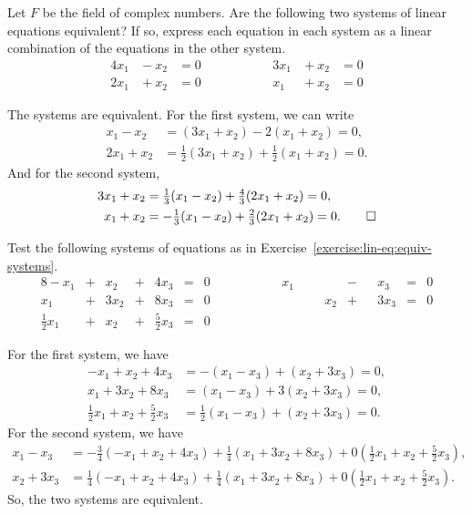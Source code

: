 \label{exercise:lin-eq:equiv-systems}
Let $F$ be the field of complex numbers. Are the following two systems
of linear equations equivalent? If so, express each equation in each
system as a linear combination of the equations in the other system.
\begin{alignat*}{4}
  x_1  &{}- x_2 &{}= 0 &\qquad\qquad& 3x_1 &{}+ x_2 &{}= 0 \\
  2x_1 &{}+ x_2 &{}= 0 &&        x_1 &{}+ x_2 &{}= 0
\end{alignat*}
\begin{solution}
  The systems are equivalent. For the first system, we can write
  \begin{align*}
    x_1 - x_2 &= (3x_1 + x_2) - 2(x_1 + x_2) = 0, \\
    2x_1 + x_2 &= \tfrac12(3x_1 + x_2) + \tfrac12(x_1 + x_2) = 0.
  \end{align*}
  And for the second system,
  \begin{align*}
    3x_1 + x_2 &= \tfrac13(x_1 - x_2) + \tfrac43(2x_1 + x_2) = 0, \\
    x_1 + x_2 &= -\tfrac13(x_1 - x_2) + \tfrac23(2x_1 + x_2) = 0. \qedhere
  \end{align*}
\end{solution}

 Test the following systems of equations as in
Exercise~\ref{exercise:lin-eq:equiv-systems}.
\begin{alignat*}{8}
  -x_1 &{}+{}& x_2 &{}+{}& 4x_3 &{}={}& 0
  &\qquad\qquad& x_1 &\phantom{{}+{}}& &{}-{}&& x_3 &{}={}& 0 \\
  x_1 &{}+{}& 3x_2 &{}+{}& 8x_3 &{}={}& 0
  && && x_2 &{}+{}&& 3x_3 &{}={}& 0 \\
  \tfrac12x_1 &{}+{}& x_2 &{}+{}& \tfrac52x_3 &{}={}& 0
\end{alignat*}
\begin{solution}
  For the first system, we have
  \begin{align*}
    -x_1 + x_2 + 4x_3 &= -(x_1 - x_3) + (x_2 + 3x_3) = 0, \\
    x_1 + 3x_2 + 8x_3 &= (x_1 - x_3) + 3(x_2 + 3x_3) = 0, \\
    \tfrac12x_1 + x_2 + \tfrac52x_3 &= \tfrac12(x_1 - x_3) + (x_2 + 3x_3) = 0.
  \end{align*}
  For the second system, we have
  \begin{align*}
    x_1 - x_3
    &= -\tfrac34(-x_1 + x_2 + 4x_3) + \tfrac14(x_1 + 3x_2 + 8x_3)
      + 0(\tfrac12x_1 + x_2 + \tfrac52x_3), \\
    x_2 + 3x_3
    &= \tfrac14(-x_1 + x_2 + 4x_3) + \tfrac14(x_1 + 3x_2 + 8x_3)
      + 0(\tfrac12x_1 + x_2 + \tfrac52x_3).
  \end{align*}
  So, the two systems are equivalent.
\end{solution}


